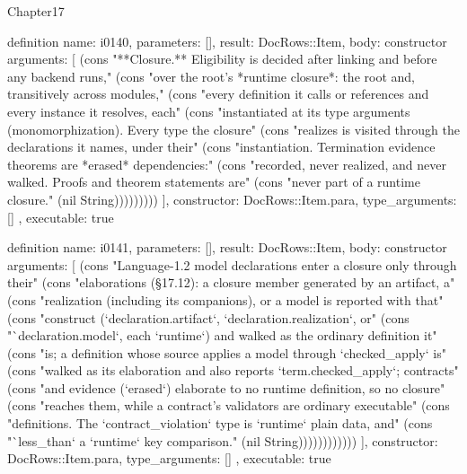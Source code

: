 \begin{lexlean}{Chapter17}
\begin{semanticmodule}
definition{
  name: i0140,
  parameters: [],
  result: DocRows::Item,
  body: constructor{
    arguments: [
      (cons "**Closure.** Eligibility is decided after linking and before any backend runs," (cons "over the root's *runtime closure*: the root and, transitively across modules," (cons "every definition it calls or references and every instance it resolves, each" (cons "instantiated at its type arguments (monomorphization). Every type the closure" (cons "realizes is visited through the declarations it names, under their" (cons "instantiation. Termination evidence theorems are *erased* dependencies:" (cons "recorded, never realized, and never walked. Proofs and theorem statements are" (cons "never part of a runtime closure." (nil String)))))))))
    ],
    constructor: DocRows::Item.para,
    type_arguments: []
  },
  executable: true
}

definition{
  name: i0141,
  parameters: [],
  result: DocRows::Item,
  body: constructor{
    arguments: [
      (cons "Language-1.2 model declarations enter a closure only through their" (cons "elaborations (§17.12): a closure member generated by an artifact, a" (cons "realization (including its companions), or a model is reported with that" (cons "construct (`declaration.artifact`, `declaration.realization`, or" (cons "`declaration.model`, each `runtime`) and walked as the ordinary definition it" (cons "is; a definition whose source applies a model through `checked_apply` is" (cons "walked as its elaboration and also reports `term.checked_apply`; contracts" (cons "and evidence (`erased`) elaborate to no runtime definition, so no closure" (cons "reaches them, while a contract's validators are ordinary executable" (cons "definitions. The `contract_violation` type is `runtime` plain data, and" (cons "`less_than` a `runtime` key comparison." (nil String))))))))))))
    ],
    constructor: DocRows::Item.para,
    type_arguments: []
  },
  executable: true
}


\end{semanticmodule}
\end{lexlean}
